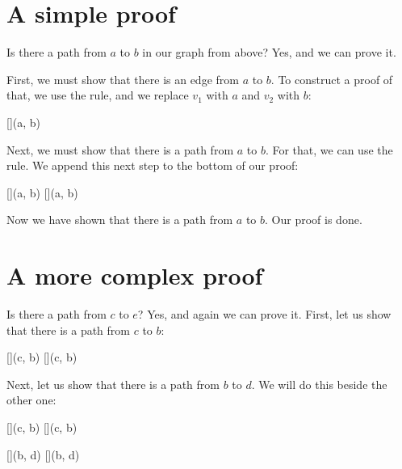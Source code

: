 \documentclass[../../../main.tex]{subfiles}
\begin{document}
\section{A simple proof}

Is there a path from $a$ to $b$ in our graph from above? Yes, and we can prove it.

First, we must show that there is an edge from $a$ to $b$. To construct a proof of that, we use the  rule, and we replace $v_{1}$ with $a$ and $v_{2}$ with $b$:

\begin{prooftree*}
  []{(a, b)}
\end{prooftree*}

\noindent
Next, we must show that there is a path from $a$ to $b$. For that, we can use the  rule. We append this next step to the bottom of our proof:

\begin{prooftree*}
  []{(a, b)}
  []{(a, b)} 
\end{prooftree*}

\noindent
Now we have shown that there is a path from $a$ to $b$. Our proof is done.



\section{A more complex proof}

Is there a path from $c$ to $e$? Yes, and again we can prove it. First, let us show that there is a path from $c$ to $b$:

\begin{prooftree*}
  []{(c, b)}
  []{(c, b)} 
\end{prooftree*}

\noindent
Next, let us show that there is a path from $b$ to $d$. We will do this beside the other one:

\begin{prooftree*}

  []{(c, b)}
  []{(c, b)} 
  
  []{(b, d)}
  []{(b, d)}   

  
\end{prooftree*}
\end{document}
